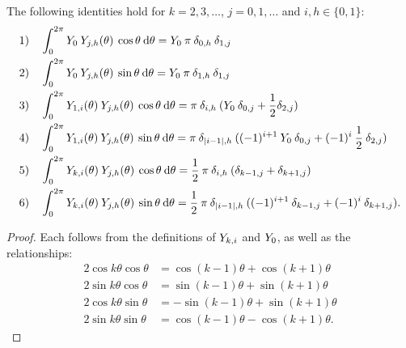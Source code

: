 \documentclass[11pt, oneside]{article}   	%
\begin{document}
\begin{lemma}\label{lemma:Yrecurrence} 
The following identities hold for $k = 2,3,\dots$, $j = 0,1,\dots$ and $i, h \in \{0,1\}$:
\begin{align*}
	&1) \quad \int_0^{2\pi} Y_0 \: Y_{j,h}(\theta) \: \cos\theta \: {\rm d} \theta = Y_0 \: \pi \: \delta_{0,h} \: \delta_{1,j} \\
	&2) \quad \int_0^{2\pi} Y_0 \: Y_{j,h}(\theta) \: \sin\theta \: {\rm d} \theta = Y_0 \: \pi \: \delta_{1,h} \: \delta_{1,j} \\
	&3) \quad \int_0^{2\pi} Y_{1,i}(\theta) \: Y_{j,h}(\theta) \: \cos\theta \: {\rm d} \theta = \pi \: \delta_{i,h} \: (Y_0 \: \delta_{0,j} + \frac{1}{2} \delta_{2,j}) \\
	&4) \quad \int_0^{2\pi} Y_{1,i}(\theta) \: Y_{j,h}(\theta) \: \sin\theta \: {\rm d} \theta = \pi \:  \delta_{|i-1|,h} \: ((-1)^{i+1} \: Y_0 \: \delta_{0,j} + (-1)^i \: \frac{1}{2} \: \delta_{2,j}) \\
	&5) \quad \int_0^{2\pi} Y_{k,i}(\theta) \: Y_{j,h}(\theta) \: \cos\theta \: {\rm d} \theta = \frac{1}{2} \: \pi \: \delta_{i,h} \: (\delta_{k-1,j} + \delta_{k+1,j}) \\
	&6) \quad \int_0^{2\pi} Y_{k,i}(\theta) \: Y_{j,h}(\theta) \: \sin\theta \: {\rm d} \theta = \frac{1}{2} \: \pi \: \delta_{|i-1|,h} \: ((-1)^{i+1} \: \delta_{k-1,j} + (-1)^i \: \delta_{k+1,j}).
\end{align*}
\end{lemma}

\begin{proof}
Each follows from the definitions of $Y_{k,i}$ and $Y_0$, as well as the relationships:
\begin{align*}
	2 \cos k \theta \cos\theta &= \cos (k-1)\theta + \cos(k+1)\theta \\
	2 \sin k \theta \cos\theta &= \sin (k-1)\theta + \sin(k+1)\theta \\
	2 \cos k \theta \sin\theta &= - \sin (k-1)\theta + \sin(k+1)\theta \\
	2 \sin k \theta \sin\theta &= \cos (k-1)\theta - \cos(k+1)\theta.
\end{align*}
\end{proof}
\end{document}
